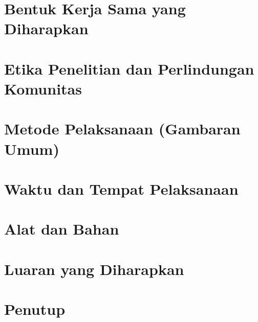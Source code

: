 \documentclass[12pt, a4paper, onecolumn, oneside, final]{report}
\begin{document}
    \section{Bentuk Kerja Sama yang Diharapkan}
    
    
    \section{Etika Penelitian dan Perlindungan Komunitas}
    
    
    \section{Metode Pelaksanaan (Gambaran Umum)}
    

    \section{Waktu dan Tempat Pelaksanaan}
    

    \section{Alat dan Bahan}
    
    
    \section{Luaran yang Diharapkan}
    
    
    \section{Penutup}
    

    
    
    \clearpage
    \printbibliography[title={Daftar Pustaka}]
    

\end{document}
